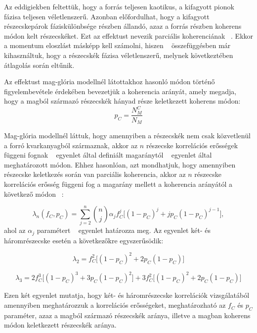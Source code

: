 \documentclass[10pt,a4paper]{article}
\numberwithin{equation}{subsection}
\numberwithin{figure}{section}
\begin{document}
Az eddigiekben feltettük, hogy a forrás teljesen kaotikus, a kifagyott pionok fázisa teljesen véletlenszerű. Azonban előfordulhat, hogy a kifagyott részecskepárok fáziskülönbsége részben állandó, azaz a forrás részben koherens módon kelt részecskéket. Ezt az effektust nevezik parciális koherenciának ~\cite{Csorgo:1998tn, Csorgo:1999sj, Csorgo:1997uf}. Ekkor a momentum eloszlást másképp kell számolni, hiszen ~ összefüggésben már kihasználtuk, hogy a részecskék fázisa véletlenszerű, melynek következtében átlagolás során eltűnik. 

Az effektust mag-glória modellnél látottakhoz hasonló módon történő figyelembevétele érdekében bevezetjük a koherencia arányát, amely megadja, hogy a magból származó részecskék hányad része keletkezett koherens módon:
\begin{equation}
p_C = \frac{N_M^C}{N_M}
\end{equation}

Mag-glória modellnél láttuk, hogy amennyiben a részecskék nem csak közvetlenül a forró kvarkanyagból származnak, akkor az $n$ részecske korrelációs erősségek függeni fognak ~ egyenlet által definiált magaránytól ~ egyenlet által meghatározott módon. Ehhez hasonlóan, azt mondhatjuk, hogy amennyiben részecske keletkezés során van parciális koherencia, akkor az $n$ részecske korrelációs erősség függeni fog a magarány mellett a koherencia arányától a következő módon ~\cite{Csorgo:1998tn, Csorgo:1997uf}:

\begin{equation}
\lambda_n(f_C, p_C) = \sum_{j=2}^{n}\binom{n}{j}\alpha_j f_C^j\big[(1-p_C)^j+jp_C(1-p_C)^{j-1}\big],
\end{equation}
ahol az $\alpha_j$ paramétert ~ egyenlet határozza meg. Az egyenlet két- és háromrészecske esetén a következőkre egyszerűsödik:

\begin{equation}
\lambda_2 =  f_C^2\big[(1-p_C)^2+2p_C(1-p_C)\big]
\end{equation}

\begin{equation}
\lambda_3 =  2f_C^3\big[(1-p_C)^3+3p_C(1-p_C)^2\big]+3f_C^2\big[(1-p_C)^2+2p_C(1-p_C)\big]
\end{equation}

Ezen két egyenlet mutatja, hogy két- és háromrészecske korrelációk vizsgálatából amennyiben meghatározzuk a korrelációs erősségeket, meghatározható az $f_C$ és $p_C$ paraméter, azaz a magból származó részecskék aránya, illetve a magban koherens módon keletkezett részecskék aránya.
\end{document}
